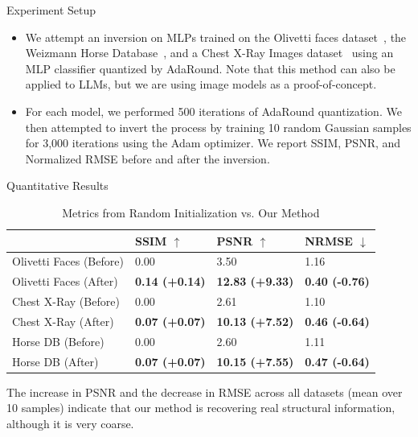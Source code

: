 \documentclass{beamer}
\begin{document}
\begin{frame}{Experiment Setup}
  \begin{itemize}
    \item We attempt an inversion on MLPs trained on the Olivetti faces dataset~\cite{JMLR:v12:pedregosa11a}, the Weizmann Horse Database~\cite{weizmannHorseDB}, and a Chest X-Ray Images dataset~\cite{kermanyIdentifyingMedicalDiagnoses2018} using an MLP classifier quantized by AdaRound. Note that this method can also be applied to LLMs, but we are using image models as a proof-of-concept.
    \item For each model, we performed 500 iterations of AdaRound quantization. We then attempted to invert the process by training 10 random Gaussian samples for 3,000 iterations using the Adam optimizer. We report SSIM, PSNR, and Normalized RMSE before and after the inversion.
  \end{itemize}
\end{frame}
\begin{frame}{Quantitative Results}
    \begin{table}
    \footnotesize
    \centering
    \caption{Metrics from Random Initialization vs. Our Method}
    \label{tab:metrics}
    \begin{tabular}{|l|l|l|l|}
    \hline
                            & SSIM $\uparrow$       & PSNR $\uparrow$        & NRMSE $\downarrow$    \\ \hline
    Olivetti Faces (Before) & 0.00                  & 3.50                   & 1.16                  \\ \hline
    Olivetti Faces (After)  & \textbf{0.14 (+0.14)} & \textbf{12.83 (+9.33)} & \textbf{0.40 (-0.76)} \\ \hline
    Chest X-Ray (Before)    & 0.00                  & 2.61                   & 1.10                  \\ \hline
    Chest X-Ray (After)     & \textbf{0.07 (+0.07)} & \textbf{10.13 (+7.52)} & \textbf{0.46 (-0.64)} \\ \hline
    Horse DB (Before)       & 0.00                  & 2.60                   & 1.11                  \\ \hline
    Horse DB (After)        & \textbf{0.07 (+0.07)} & \textbf{10.15 (+7.55)} & \textbf{0.47 (-0.64)} \\ \hline
    \end{tabular}
    \end{table}
    \vfill
    The increase in PSNR and the decrease in RMSE across all datasets (mean over 10 samples) indicate that our method is recovering real structural information, although it is very coarse.
\end{frame}
\end{document}

